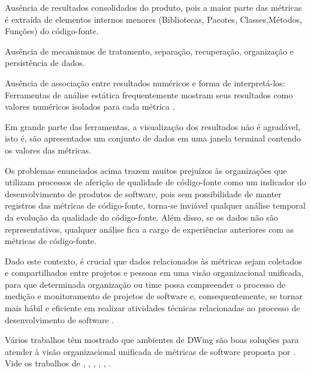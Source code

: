 
\begin{problems}
    \item Ausência de resultados consolidados do produto, pois a maior 
	parte das métricas é extraída de elementos internos menores (Bibliotecas, 
	Pacotes, Classes,Métodos, Funções) do código-fonte.
    
	\item Ausência de mecanismos de tratamento, separação, recuperação, 
	organização e persistência de dados. 
	
	\item Ausência de associação entre resultados numéricos e forma de 
	interpretá-los: Ferramentas de análise estática frequentemente mostram 
	seus resultados como valores numéricos isolados para cada métrica 
	\cite{Meirelles2013}. 
	
	\item Em grande parte das ferramentas, a visualização dos resultados não é 
	agradável, isto é, são apresentados um conjunto de dados em uma janela 
	terminal contendo os valores das métricas.
	
    \end{problems}
	
Os problemas enunciados acima trazem muitos prejuízos às organizações que 
utilizam processos de aferição de qualidade de código-fonte como um indicador do
desenvolvimento de produtos de software, pois sem possibilidade de manter 
registros das métricas de código-fonte, torna-se inviável qualquer análise 
temporal da evolução da qualidade do código-fonte. Além disso, se os dados não 
são representativos, qualquer análise fica a cargo de experiências anteriores 
com as métricas de código-fonte.

Dado este contexto, é crucial que dados relacionados às métricas sejam coletados 
e compartilhados entre projetos e pessoas em uma visão organizacional unificada, 
para que determinada organização ou time possa compreender o processo de medição 
e monitoramento de projetos de software e, consequentemente, se 
tornar mais hábil e eficiente em realizar atividades técnicas relacionadas ao 
processo de desenvolvimento de software 
\cite{Chulani2003}.

Vários trabalhos têm mostrado que ambientes de DWing são boas soluções para 
atender à visão organizacional unificada de métricas de software proposta por 
. Vide os trabalhos de , 
, , , 
, .


